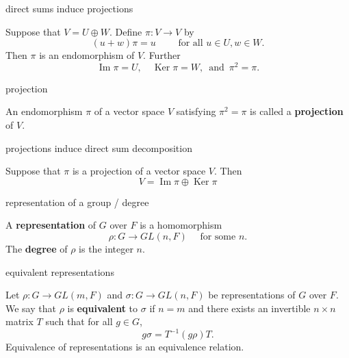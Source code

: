 \documentclass[avery5371,grid]{flashcards}
\DeclareMathOperator{\Ker}{\ensuremath{\textrm{Ker}}}
\DeclareMathOperator{\Img}{\ensuremath{\textrm{Im}}}
\newcommand{\defn}[1]{\textbf{#1}}
\begin{document}
\begin{flashcard}[Proposition 2.29]{direct sums induce projections}

  Suppose that $V = U \oplus W$. Define $\pi : V \to V$ by
  \[
    (u+w)\pi = u \qquad \text{ for all } u\in U, w \in W.
  \]
  Then $\pi$ is an endomorphism of $V$. Further
  \[
    \Img \pi = U, \quad \Ker \pi = W, \, \text{ and } \, \pi^2 = \pi.
  \]

\end{flashcard}

\begin{flashcard}[Definition 2.30]{projection}

  An endomorphism $\pi$ of a vector space $V$ satisfying $\pi^2 = \pi$
  is called a \defn{projection} of $V$.

\end{flashcard}

\begin{flashcard}[Proposition2.32]{projections induce direct sum
    decomposition}

  Suppose that $\pi$ is a projection of a vector space $V$. Then
  \[
    V = \Img \pi \oplus \Ker \pi
  \]

\end{flashcard}

\begin{flashcard}[Definition 3.1]{representation of a group / degree}

  A \defn{representation} of $G$ over $F$ is a homomorphism
  \[
    \rho : G \to GL(n, F) \quad \text{ for some } n.
  \]
  The \defn{degree} of $\rho$ is the integer $n$.

\end{flashcard}

\begin{flashcard}[Definition 3.3]{equivalent representations}

  Let $\rho : G \to GL(m, F)$ and $\sigma : G \to GL(n, F)$ be
  representations of $G$ over $F$. We say that $\rho$ is
  \defn{equivalent} to $\sigma$ if $n=m$ and there exists an
  invertible $n\times n$ matrix $T$ such that for all $g \in G$,
  \[
    g\sigma = T^{-1}(g\rho)T.
  \]
  Equivalence of representations is an equivalence relation.

\end{flashcard}
\end{document}
